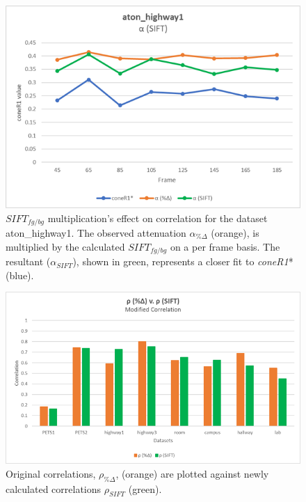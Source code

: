 \begin{figure}
  \centering
  \includegraphics[width=.8\linewidth]{figures/highway1_sift.jpg}
\caption{$SIFT_{fg/bg}$ multiplication's effect on correlation for the dataset aton\_highway1. The observed attenuation $\alpha_{\%\Delta}$ (orange), is multiplied by the calculated $SIFT_{fg/bg}$ on a per frame basis. The resultant ($\alpha_{SIFT}$), shown in green, represents a closer fit to \textit{coneR1}* (blue).}
\label{fig:highway1_sift}
\end{figure}

\begin{figure}
  \includegraphics[width=1\linewidth]{figures/sift_correlation_diff.jpg}
\caption{Original correlations, $\rho_{\%\Delta}$, (orange) are plotted against newly calculated correlations $\rho_{SIFT}$ (green).}
\label{fig:corr_diff_sift}
\end{figure}

